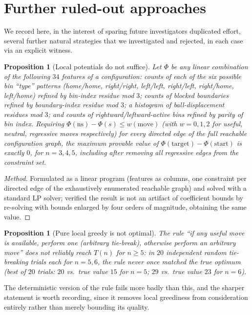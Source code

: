 \documentclass[11pt]{amsart}
\theoremstyle{plain}
\newtheorem{proposition}[theorem]{Proposition}
\theoremstyle{definition}
\theoremstyle{remark}
\begin{document}
\section{Further ruled-out approaches}
\label{sec:ruledout}

We record here, in the interest of sparing future investigators duplicated effort, several further natural strategies that we investigated and rejected, in each case via an explicit witness.

\begin{proposition}[Local potentials do not suffice]
\label{prop:LPfails}
Let $\Phi$ be any linear combination of the following $34$ features of a configuration: counts of each of the six possible bin ``type'' patterns (home/home, right/right, left/left, right/left, right/home, left/home) refined by bin-index residue mod $3$; counts of blocked boundaries refined by boundary-index residue mod $3$; a histogram of ball-displacement residues mod $3$; and counts of rightward/leftward-active bins refined by parity of bin index. Requiring $\Phi(\text{ns})-\Phi(s) \le w(\text{move})$ (with $w=0,1,2$ for useful, neutral, regressive moves respectively) for \emph{every} directed edge of the full reachable configuration graph, the maximum provable value of $\Phi(\text{target})-\Phi(\text{start})$ is exactly $0$, for $n=3,4,5$, including after removing all regressive edges from the constraint set.
\end{proposition}

\begin{proof}[Method]
Formulated as a linear program (features as columns, one constraint per directed edge of the exhaustively enumerated reachable graph) and solved with a standard LP solver; verified the result is not an artifact of coefficient bounds by re-solving with bounds enlarged by four orders of magnitude, obtaining the same value.
\end{proof}

\begin{proposition}[Pure local greedy is not optimal]
\label{prop:greedyfails}
The rule ``if any useful move is available, perform one (arbitrary tie-break), otherwise perform an arbitrary move'' does not reliably reach $T(n)$ for $n\ge 5$: in $20$ independent random tie-breaking trials each for $n=5,6$, the rule never once matched the true optimum (best of $20$ trials: $20$ vs.\ true value $15$ for $n=5$; $29$ vs.\ true value $23$ for $n=6$).
\end{proposition}

The deterministic version of the rule fails more badly than this, and the sharper statement is worth recording, since it removes local greediness from consideration entirely rather than merely bounding its quality.
\end{document}
